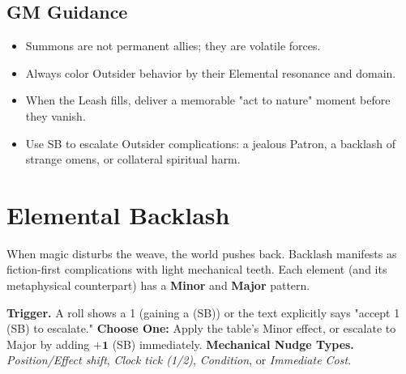 \subsection{GM Guidance}
\begin{itemize}
  \item Summons are not permanent allies; they are volatile forces.
  \item Always color Outsider behavior by their Elemental resonance and domain.
  \item When the Leash fills, deliver a memorable "act to nature" moment before they vanish.
  \item Use SB to escalate Outsider complications: a jealous Patron, a backlash of strange omens, or collateral spiritual harm.
\end{itemize}


\section{Elemental Backlash}\label{sec:backlash-tables}

When magic disturbs the weave, the world pushes back. Backlash manifests as fiction-first complications with light mechanical teeth. Each element (and its metaphysical counterpart) has a \textbf{Minor} and \textbf{Major} pattern.

\begin{tcolorbox}[title={Using Backlash at the Table},colback=gray!5,colframe=black]
\textbf{Trigger.} A roll shows a 1 (gaining a (SB)) or the text explicitly says "accept 1 (SB) to escalate."\newline
\textbf{Choose One:} Apply the table's Minor effect, or escalate to Major by adding $\mathbf{+1}$ (SB) immediately.\newline
\textbf{Mechanical Nudge Types.} \emph{Position/Effect shift}, \emph{Clock tick (1/2)}, \emph{Condition}, or \emph{Immediate Cost}.
\end{tcolorbox}

